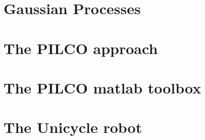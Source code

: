 \documentclass[main.tex]{subfiles}
\begin{document}
\section{Gaussian Processes}

\section{The PILCO approach}

\section{The PILCO matlab toolbox}

\section{The Unicycle robot}
\end{document}
